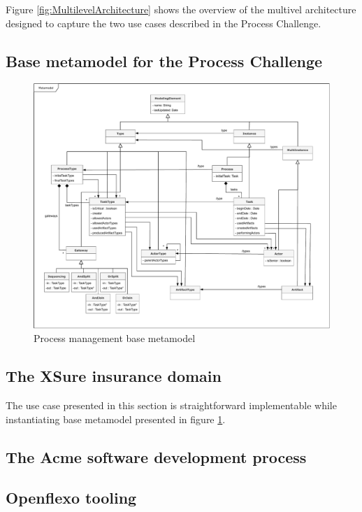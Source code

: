 
Figure \ref{fig:MultilevelArchitecture} shows the overview of the multivel architecture designed to capture the two use cases described in the Process Challenge.


\subsection{Base metamodel for the Process Challenge}

\begin{figure}
 \centering
    \includegraphics[width=1.0 \textwidth]{Figures/Metamodel.pdf}
    \caption{Process management base metamodel}
    \label{fig:BaseMetamodel}
\end{figure}

\subsection{The XSure insurance domain}

The use case presented in this section is straightforward implementable while instantiating base metamodel presented in figure \ref{fig:BaseMetamodel}.



\subsection{The Acme software development process}

\subsection{Openflexo tooling}



